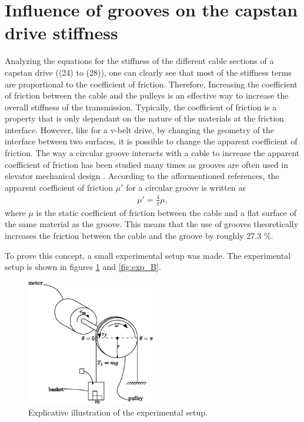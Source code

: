 \documentclass[10pt,cleanfoot]{asme2ej}
\begin{document}
\section{Influence of grooves on the capstan drive stiffness}
 Analyzing the equations for the stiffness of the different cable sections of a capstan drive ((24) to (28)), one can clearly see that most of the stiffness terms are proportional to the coefficient of friction. Therefore, Increasing the coefficient of friction between the cable and the pulleys is an effective way to increase the overall stiffness of the transmission. Typically, the coefficient of friction is a property that is only dependant on the nature of the materials at the friction interface. However, like for a v-belt drive, by changing the geometry of the interface between two surfaces, it is possible to change the apparent coefficient of friction. The way a circular groove interacts with a cable to increase the apparent coefficient of friction has been studied many times as grooves are often used in elevator mechanical design \cite{elevator_german}\cite{elevator}\cite{gibsonfred}\cite{koshaktraction}. According to the afformentioned references, the apparent coefficient of friction $\mu'$ for a circular groove is written as 
 \begin{align}
\mu' = \frac{4}{\pi}\mu, 
 \end{align}
where $\mu$ is the static coefficient of friction between the cable and a flat surface of the same material as the groove. This means that the use of grooves theoretically increases the friction between the cable and the groove by roughly 27.3 \%.
\par
To prove this concept, a small experimental setup was made. The experimental setup is shown in figures \ref{fig:exp_A} and \ref{fig:exp_B}. 
\begin{figure}
\centering
\includegraphics[width=0.5\textwidth]{experimental_setup.eps}
\caption{Explicative illustration of the experimental setup.}
\label{fig:exp_A}
\end{figure}
\end{document}
